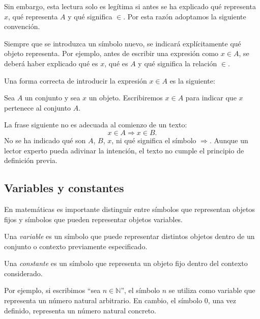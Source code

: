Sin embargo, esta lectura solo es legítima si antes se ha explicado qué representa \(x\), qué representa \(A\) y qué significa \(\in\). Por esta razón adoptamos la siguiente convención.

\begin{convencion}
Siempre que se introduzca un símbolo nuevo, se indicará explícitamente qué objeto representa. Por ejemplo, antes de escribir una expresión como \(x\in A\), se deberá haber explicado qué es \(x\), qué es \(A\) y qué significa la relación \(\in\).
\end{convencion}

\begin{ejemplo}
Una forma correcta de introducir la expresión \(x\in A\) es la siguiente:

Sea \(A\) un conjunto y sea \(x\) un objeto. Escribiremos \(x\in A\) para indicar que \(x\) pertenece al conjunto \(A\).
\end{ejemplo}

\begin{ejemplo}
La frase siguiente no es adecuada al comienzo de un texto:
\[
  x\in A \Rightarrow x\in B.
\]
No se ha indicado qué son \(A\), \(B\), \(x\), ni qué significa el símbolo \(\Rightarrow\). Aunque un lector experto pueda adivinar la intención, el texto no cumple el principio de definición previa.
\end{ejemplo}

\subsection{Variables y constantes}
\label{subsec:variables-constantes}

En matemáticas es importante distinguir entre símbolos que representan objetos fijos y símbolos que pueden representar objetos variables.

\begin{definicion}[Variable]
Una \emph{variable} es un símbolo que puede representar distintos objetos dentro de un conjunto o contexto previamente especificado.
\end{definicion}

\begin{definicion}[Constante]
Una \emph{constante} es un símbolo que representa un objeto fijo dentro del contexto considerado.
\end{definicion}

Por ejemplo, si escribimos ``sea \(n\in \mathbb{N}\)'', el símbolo \(n\) se utiliza como variable que representa un número natural arbitrario. En cambio, el símbolo \(0\), una vez definido, representa un número natural concreto.

